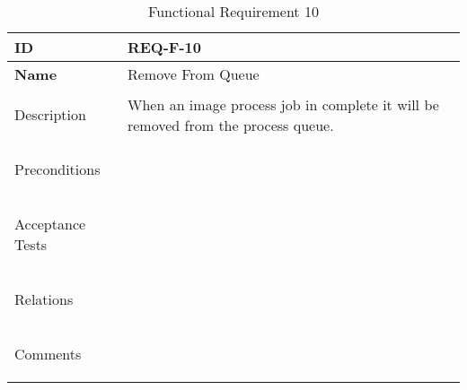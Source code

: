 \begin{table}[H]
    \begin{tabular}[t]{ | >{\bfseries}l | p{9.5cm} |}

    \hline
    ID
    &  REQ-F-10 \\ \hline

    Name
    & Remove From Queue \\ \hline

    Description
    & When an image process job in complete it will be removed from the process queue. \\ \hline

    Preconditions
    &  \\ \hline

    Acceptance Tests
    & \\ \hline

    Relations
    &  \\ \hline

    Comments
    &  \\ \hline

    \end{tabular}

    \caption{Functional Requirement 10}
    \label{fig:req_f_10}

\end{table}